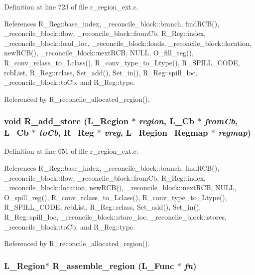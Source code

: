 Definition at line 723 of file r\_\-region\_\-ext.c.

References R\_\-Reg::base\_\-index, \_\-reconcile\_\-block::branch, find\-RCB(), \_\-reconcile\_\-block::flow, \_\-reconcile\_\-block::from\-Cb, R\_\-Reg::index, \_\-reconcile\_\-block::load\_\-loc, \_\-reconcile\_\-block::loads, \_\-reconcile\_\-block::location, new\-RCB(), \_\-reconcile\_\-block::next\-RCB, NULL, O\_\-fill\_\-reg(), R\_\-conv\_\-rclass\_\-to\_\-Lclass(), R\_\-conv\_\-type\_\-to\_\-Ltype(), R\_\-SPILL\_\-CODE, rcb\-List, R\_\-Reg::rclass, Set\_\-add(), Set\_\-in(), R\_\-Reg::spill\_\-loc, \_\-reconcile\_\-block::to\-Cb, and R\_\-Reg::type.

Referenced by R\_\-reconcile\_\-allocated\_\-region().
\subsubsection{\setlength{\rightskip}{0pt plus 5cm}void R\_\-add\_\-store (L\_\-Region $\ast$ {\em region}, L\_\-Cb $\ast$ {\em from\-Cb}, L\_\-Cb $\ast$ {\em to\-Cb}, \bf{R\_\-Reg} $\ast$ {\em vreg}, L\_\-Region\_\-Regmap $\ast$ {\em regmap})}\label{r__region__ext_8c_5176d106600ba33ed2174d2392857c5c}




Definition at line 651 of file r\_\-region\_\-ext.c.

References R\_\-Reg::base\_\-index, \_\-reconcile\_\-block::branch, find\-RCB(), \_\-reconcile\_\-block::flow, \_\-reconcile\_\-block::from\-Cb, R\_\-Reg::index, \_\-reconcile\_\-block::location, new\-RCB(), \_\-reconcile\_\-block::next\-RCB, NULL, O\_\-spill\_\-reg(), R\_\-conv\_\-rclass\_\-to\_\-Lclass(), R\_\-conv\_\-type\_\-to\_\-Ltype(), R\_\-SPILL\_\-CODE, rcb\-List, R\_\-Reg::rclass, Set\_\-add(), Set\_\-in(), R\_\-Reg::spill\_\-loc, \_\-reconcile\_\-block::store\_\-loc, \_\-reconcile\_\-block::stores, \_\-reconcile\_\-block::to\-Cb, and R\_\-Reg::type.

Referenced by R\_\-reconcile\_\-allocated\_\-region().
\subsubsection{\setlength{\rightskip}{0pt plus 5cm}L\_\-Region$\ast$ R\_\-assemble\_\-region (L\_\-Func $\ast$ {\em fn})}\label{r__region__ext_8c_d200cb12c11b8a014597a62f2d5c42fc}




